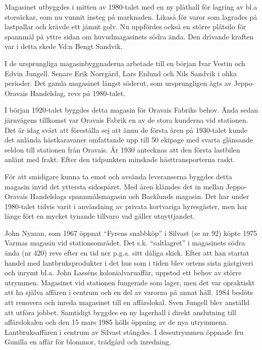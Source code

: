 Magasinet utbyggdes i mitten av 1980-talet med en ny plåthall för lagring av bl.a storsäckar, som nu vunnit insteg på marknaden. Likaså för varor som lagrades på lastpallar och krävde ett jämnt golv. Nu uppfördes också en större plåtsilo för spannmål på yttre sidan om huvudmagasinets södra ända. Den drivande kraften var i detta skede Vd:n Bengt Sandvik.

I de ursprungliga magasinbyggnaderna arbetade till en början Ivar Vestin och Edvin Jungell. Senare Erik Norrgård, Lars Enlund och Nils Sandvik i olika perioder. Det gamla magasinet längst söderut, som ursprungligen ägts av Jeppo-Oravais Handelslag, revs på 1980-talet.





I  början 1920-talet byggdes detta magasin för Oravais Fabriks behov. Ända sedan järnvägens tillkomst var Oravais Fabrik en av de stora kunderna vid stationen. Det är idag svårt att föreställa sej att ännu de första åren på 1930-talet kunde det anlända hästkaravaner omfattande upp till 50 ekipage med svarta glänsande seldon till stationen från Oravais. År 1930 antecknas att den första lastbilen anlänt med frakt. Efter den tidpunkten minskade hästtransporterna raskt.

För att smidigare kunna ta emot och avsända leveranserna byggdes detta magasin invid det yttersta sidospåret. Med åren klämdes det in mellan Jeppo-Oravais Handelslags spannmålsmagasin och Backlunds magasin. Det har under 1980-talet tidvis varit i användning av privata kortvariga hyresgäster, men har länge fört en mycket tynande tillvaro vad gäller utnyttjandet.





John Nyman, som 1967 öppnat ``Fyrens snabbköp'' i Silvast (se nr 92) köpte 1975 Varmas magasin vid stationsområdet. Det s.k. ``saltlagret'' i magasinets södra ända (nr 420) revs efter en tid ner p.g.a. sitt dåliga skick. Efter att han startat handel med lantbruksprodukter i det hus som i tiden blev ortens sista gästgiveri och inrymt bl.a. John Lasséns kolonialvaruaffär, uppstod ett behov av större utrymmen. Magasinet vid stationen fungerade som lager, men det var opraktiskt att ha själva affären i centrum och en del av varorna på annat håll. 1984 beslöts att renovera  och inreda magasinet till en affärslokal. Sven Jungell blev anställd att utföra jobbet. Samtidigt byggdes en ny lagerhall i direkt anslutning till affärslokalen och den 15 mars 1985 hölls öppning av de nya utrymmena. Lantbruksaffären i centrum av Silvast stängdes. I dessutrymmen öppnade fru Gunilla en affär för blommor, trädgård och inredning.

